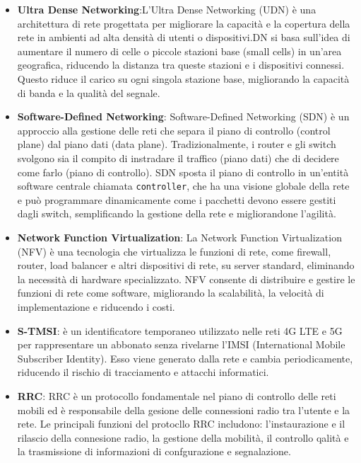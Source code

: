 \documentclass[english]{article}
\begin{document}
\begin{itemize}
	\item \textbf{Ultra Dense Networking}\hypertarget{UDN}{}:L'Ultra Dense Networking (UDN) è una
	      architettura di rete progettata per migliorare la capacità e la copertura della rete
	      in ambienti ad alta densità di utenti o dispositivi.DN si basa sull'idea di aumentare
	      il numero di celle o piccole stazioni base (small cells) in un'area geografica,
	      riducendo la distanza tra queste stazioni e i dispositivi connessi. Questo riduce il
	      carico su ogni singola stazione base, migliorando la capacità di banda e la qualità
	      del segnale.

	\item \textbf{Software-Defined Networking}\hypertarget{SDN}{}:  Software-Defined Networking (SDN)
	      è un approccio alla gestione delle reti che separa il piano di controllo (control plane)
	      dal piano dati (data plane). Tradizionalmente, i router e gli switch svolgono sia il
	      compito di instradare il traffico (piano dati) che di decidere come farlo
	      (piano di controllo). SDN sposta il piano di controllo in un'entità software centrale
	      chiamata \texttt{controller}, che ha una visione globale della rete e può programmare
	      dinamicamente come i pacchetti devono essere gestiti dagli switch, semplificando la
	      gestione della rete e migliorandone l'agilità.

	\item \textbf{Network Function Virtualization}\hypertarget{NFV}{}: La Network Function
	      Virtualization (NFV) è una tecnologia che virtualizza le funzioni di rete, come firewall,
	      router, load balancer e altri dispositivi di rete, su server standard,
	      eliminando la necessità di hardware specializzato. NFV consente di distribuire e gestire
	      le funzioni di rete come software, migliorando la scalabilità, la velocità di
	      implementazione e riducendo i costi.

	\item \textbf{\hypertarget{S-TMSI}{S-TMSI}}: è un identificatore temporaneo
	      utilizzato nelle reti 4G LTE e 5G per rappresentare un abbonato senza rivelarne
	      l'IMSI (International Mobile Subscriber Identity).
	      Esso viene generato dalla rete e cambia periodicamente,
	      riducendo il rischio di tracciamento e attacchi informatici.

	\item \textbf{\hypertarget{RRC}{RRC}}: RRC è un protocollo fondamentale
	      nel piano di controllo delle reti mobili ed è responsabile della gesione delle
	      connessioni radio tra l'utente e la rete. Le principali funzioni
	      del protocllo RRC includono: l'instaurazione e il rilascio della connesione radio,
	      la gestione della mobilità, il controllo qalità  e la trasmissione di informazioni
	      di confgurazione e segnalazione.


\end{itemize}
\end{document}
